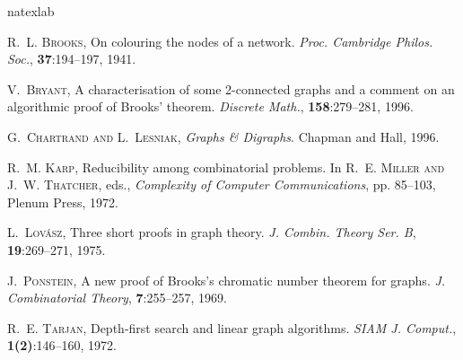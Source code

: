 \documentclass{article}
\begin{document}
\def\soft#1{\leavevmode\setbox0=\hbox{h}\dimen7=\ht0\advance \dimen7
  by-1ex\relax\if t#1\relax\rlap{\raise.6\dimen7
  \hbox{\kern.3ex\char'47}}#1\relax\else\if T#1\relax
  \rlap{\raise.5\dimen7\hbox{\kern1.3ex\char'47}}#1\relax \else\if
  d#1\relax\rlap{\raise.5\dimen7\hbox{\kern.9ex \char'47}}#1\relax\else\if
  D#1\relax\rlap{\raise.5\dimen7 \hbox{\kern1.4ex\char'47}}#1\relax\else\if
  l#1\relax \rlap{\raise.5\dimen7\hbox{\kern.4ex\char'47}}#1\relax \else\if
  L#1\relax\rlap{\raise.5\dimen7\hbox{\kern.7ex
  \char'47}}#1\relax\else\message{accent \string\soft \space #1 not
  defined!}#1\relax\fi\fi\fi\fi\fi\fi} \def\cprime{}
\begin{thebibliography}{7}
\expandafter\ifx\csname natexlab\endcsname\relax\def\natexlab#1{#1}\fi

\textsc{R.~L. Brooks}, On colouring the nodes of a network. \emph{Proc.
  Cambridge Philos. Soc.}, \textbf{37}:194--197, 1941.

\textsc{V.~Bryant}, A characterisation of some 2-connected graphs and a comment
  on an algorithmic proof of {B}rooks' theorem. \emph{Discrete Math.},
  \textbf{158}:279--281, 1996.

\textsc{G.~Chartrand and L.~Lesniak}, \emph{Graphs \& Digraphs}. Chapman and
  Hall, 1996.

\textsc{R.~M. Karp}, Reducibility among combinatorial problems. In
  \textsc{R.~E. Miller and J.~W. Thatcher}, eds., \emph{Complexity of Computer
  Communications}, pp. 85--103, Plenum Press, 1972.

\textsc{L.~Lov\'{a}sz}, Three short proofs in graph theory. \emph{J. Combin.
  Theory Ser. B}, \textbf{19}:269--271, 1975.

\textsc{J.~Ponstein}, A new proof of {B}rooks's chromatic number theorem for
  graphs. \emph{J. Combinatorial Theory}, \textbf{7}:255--257, 1969.

\textsc{R.~E. Tarjan}, Depth-first search and linear graph algorithms.
  \emph{SIAM J. Comput.}, \textbf{1(2)}:146--160, 1972.

\end{thebibliography}
\end{document}
